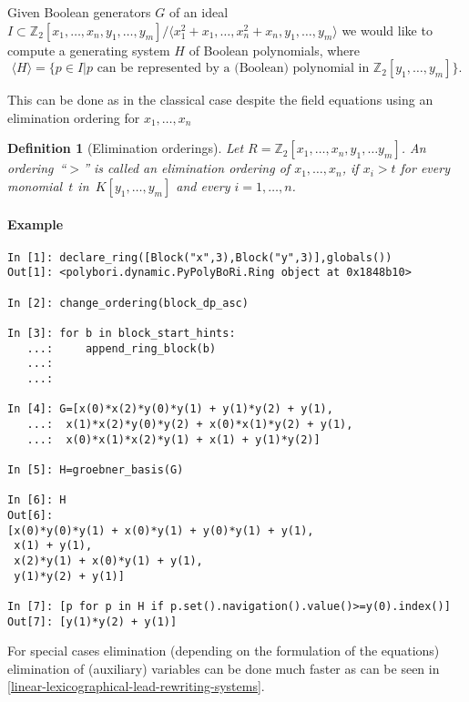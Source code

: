 \documentclass[]{article}
\newcommand{\set}[1]{\{#1\}}
\newcommand{\Ztwo}{\mathbb{Z}_2}
\newcounter{thm}
\newtheorem{definition}[thm]{Definition}
\begin{document}
Given Boolean generators $G$ of an ideal $I\subset \Ztwo[x_1,\ldots,x_n,y_1,\ldots,y_m]/\langle x_1^2+x_1,\ldots,x_n^2+x_n,y_1,\ldots,y_m \rangle$
we would like to compute a generating system $H$ of Boolean polynomials, where $$\langle H\rangle=\set{p\in I\vert p \mbox{ can be represented by a (Boolean) polynomial in } \Ztwo[y_1,\ldots,y_m]}.$$

This can be done as in the classical case despite the field equations using an elimination ordering for $x_1, \ldots, x_n$

\begin{definition}[Elimination orderings]
  Let $R=\Ztwo[x_1,\ldots, x_n, y_1, \ldots y_m]$. An ordering~``$>$'' is called an \emph{elimination ordering} of $x_1, \ldots, x_n$, if $x_i>t$ 
  for every monomial~$t$ in~$K[y_1, \ldots, y_m]$ and every $i=1,\ldots,n$. 
\end{definition}
\paragraph{Example} %
\label{par:example-elimination}
\begin{verbatim}
In [1]: declare_ring([Block("x",3),Block("y",3)],globals())
Out[1]: <polybori.dynamic.PyPolyBoRi.Ring object at 0x1848b10>

In [2]: change_ordering(block_dp_asc)

In [3]: for b in block_start_hints:
   ...:     append_ring_block(b)
   ...:     
   ...:     

In [4]: G=[x(0)*x(2)*y(0)*y(1) + y(1)*y(2) + y(1),
   ...:  x(1)*x(2)*y(0)*y(2) + x(0)*x(1)*y(2) + y(1),
   ...:  x(0)*x(1)*x(2)*y(1) + x(1) + y(1)*y(2)]

In [5]: H=groebner_basis(G)

In [6]: H
Out[6]: 
[x(0)*y(0)*y(1) + x(0)*y(1) + y(0)*y(1) + y(1),
 x(1) + y(1),
 x(2)*y(1) + x(0)*y(1) + y(1),
 y(1)*y(2) + y(1)]

In [7]: [p for p in H if p.set().navigation().value()>=y(0).index()]
Out[7]: [y(1)*y(2) + y(1)]
\end{verbatim}

For special cases elimination (depending on the formulation of the equations) elimination of (auxiliary) variables can be done much faster as can be seen in \ref{linear-lexicographical-lead-rewriting-systems}.


\end{document}
